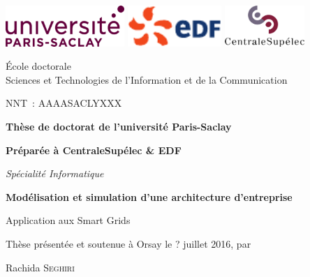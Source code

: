 \begin{titlepage}
\newcommand{\Mme}{M\textsuperscript{me}}
\vspace*{-2cm}
\includegraphics[height=1.55cm]{logo/ParisSaclay}\hfill
\includegraphics[height=1.55cm]{logo/Logo_EDF}\hfill
\includegraphics[height=1.55cm]{logo/CentraleSupelec}

\hrulefill

\begin{minipage}[t]{0.6\textwidth}
    {\small
        École doctorale \\
        Sciences et Technologies de l'Information et de la Communication\\
    }
\end{minipage}
\hfill
\begin{minipage}[t]{0.3\textwidth}
    NNT~: AAAASACLYXXX
\end{minipage}

\bigskip
\bigskip

\begin{center}
{\large\bfseries Thèse de doctorat de l'université Paris-Saclay}

{\large\bfseries Préparée à CentraleSupélec \& EDF}

{\large \textit{Spécialité Informatique}}

\vfill

{\LARGE\bfseries
    Modélisation et simulation d'une architecture d'entreprise
    
    Application aux Smart Grids
}

\vfill

{\large Thèse présentée et soutenue à Orsay le ? juillet 2016, par}


\bigskip

{\Large Rachida \textsc{Seghiri}}


\end{center}
\end{titlepage}
